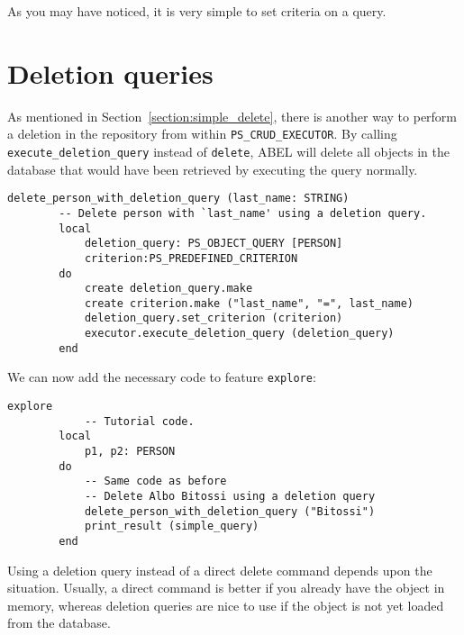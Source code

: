 \documentclass[a4paper,12pt]{report}
\begin{document}
As you may have noticed, it is very simple to set criteria on a query.

\section{Deletion queries}
\label{section:deletion_query}

As mentioned in Section~\ref{section:simple_delete}, there is another way to perform a deletion in the repository from within
\lstinline!PS_CRUD_EXECUTOR!. By calling \lstinline{execute_deletion_query} instead of \lstinline{delete}, ABEL will delete all objects in the database that would have been retrieved by executing the query normally.

\begin{lstlisting}[language=OOSC2Eiffel, captionpos=b, caption={Using a deletion query.}, label={lst:deletion_query}]
	delete_person_with_deletion_query (last_name: STRING)
		-- Delete person with `last_name' using a deletion query.
		local
			deletion_query: PS_OBJECT_QUERY [PERSON]
			criterion:PS_PREDEFINED_CRITERION
		do
			create deletion_query.make
			create criterion.make ("last_name", "=", last_name)
			deletion_query.set_criterion (criterion)
			executor.execute_deletion_query (deletion_query)
		end
\end{lstlisting}

We can now add the necessary code to feature \lstinline{explore}:  
\begin{lstlisting}[language=OOSC2Eiffel, captionpos=b, caption={Invoking the code that searches for Albo Bitossi}, label={lst:tutorial_print_result}]
	explore
			-- Tutorial code.
		local
			p1, p2: PERSON
		do
			-- Same code as before
			-- Delete Albo Bitossi using a deletion query
			delete_person_with_deletion_query ("Bitossi")
			print_result (simple_query)
		end
\end{lstlisting}
Using a deletion query instead of a direct delete command depends upon the situation. Usually, a direct command is better if you already have the object in memory, whereas deletion queries are nice to use if the object is not yet loaded from the database.
\end{document}
